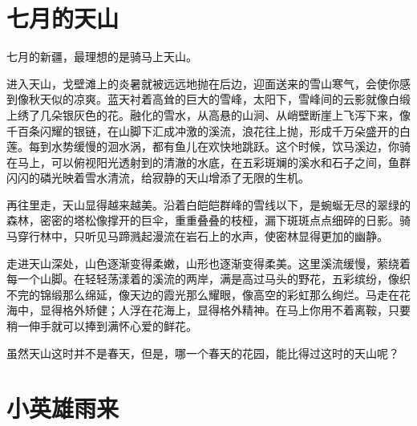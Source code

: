 \documentclass[12pt,UTF-8,openany]{ctexbook}
\begin{document}
\chapter{七月的天山}

\begin{large}
    
    七月的新疆，最理想的是骑马上天山。
    
    进入天山，戈壁滩上的炎暑就被远远地抛在后边，迎面送来的雪山寒气，会使你感到像秋天似的凉爽。蓝天衬着高耸的巨大的雪峰，太阳下，雪峰间的云影就像白缎上绣了几朵银灰色的花。融化的雪水，从高悬的山涧、从峭壁断崖上飞泻下来，像千百条闪耀的银链，在山脚下汇成冲激的溪流，浪花往上抛，形成千万朵盛开的白莲。每到水势缓慢的洄水涡，都有鱼儿在欢快地跳跃。这个时候，饮马溪边，你骑在马上，可以俯视阳光透射到的清澈的水底，在五彩斑斓的溪水和石子之间，鱼群闪闪的磷光映着雪水清流，给寂静的天山增添了无限的生机。
    
    再往里走，天山显得越来越美。沿着白皑皑群峰的雪线以下，是蜿蜒无尽的翠绿的森林，密密的塔松像撑开的巨伞，重重叠叠的枝桠，漏下斑斑点点细碎的日影。骑马穿行林中，只听见马蹄溅起漫流在岩石上的水声，使密林显得更加的幽静。
    
    走进天山深处，山色逐渐变得柔嫩，山形也逐渐变得柔美。这里溪流缓慢，萦绕着每一个山脚。在轻轻荡漾着的溪流的两岸，满是高过马头的野花，五彩缤纷，像织不完的锦缎那么绵延，像天边的霞光那么耀眼，像高空的彩虹那么绚烂。马走在花海中，显得格外矫健；人浮在花海上，显得格外精神。在马上你用不着离鞍，只要稍一伸手就可以捧到满怀心爱的鲜花。
    
    虽然天山这时并不是春天，但是，哪一个春天的花园，能比得过这时的天山呢？
    
\end{large}



\chapter{小英雄雨来}
\end{document}
